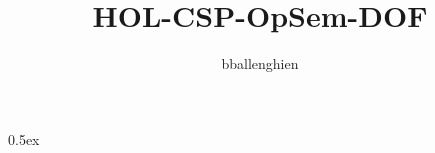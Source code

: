 \documentclass[11pt,a4paper]{article}
\begin{document}
\title{HOL-CSP-OpSem-DOF}
\author{bballenghien}
\maketitle

\tableofcontents

\parindent 0pt\parskip 0.5ex



%
%
\end{document}
